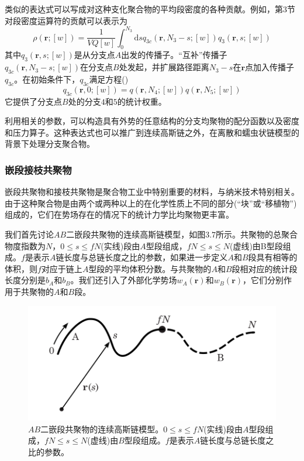 类似的表达式可以写成对这种支化聚合物的平均段密度的各种贡献。例如，第$3$节对段密度运算符的贡献可以表示为
\begin{equation}
\rho(\mathbf{r};[w])=\frac{1}{VQ[w]}\int _{0}^{N_3} \mathrm{d}sq_{3c}(\mathbf{r},N_3-s;[w])q_3(\mathbf{r},s;[w])
\end{equation}
其中$q_3(\mathbf{r},s;[w])$是从分支点$A$出发的传播子。“互补”传播子$q_{3c}(\mathbf{r},N_3-s;[w])$在分支点$B$处发起，并扩展路径距离$N_3-s$在$\mathbf{r}$点加入传播子$q_{3c}$。在初始条件下，$q_{3c}$满足方程(\label{传播子求导})
\begin{equation}
q_{3c}(\mathbf{r},0;[w])=q(\mathbf{r},N_4;[w])q(\mathbf{r},N_5;[w])
\end{equation}
它提供了分支点$B$处的分支$4$和$5$的统计权重。

利用相关的参数，可以构造具有外势的任意结构的分支均聚物的配分函数以及密度和压力算子。这种表达式也可以推广到连续高斯链之外，在离散和蠕虫状链模型的背景下处理分支聚合物。

\subsubsection{嵌段接枝共聚物}
嵌段共聚物和接枝共聚物是聚合物工业中特别重要的材料，与纳米技术特别相关。由于这种聚合物是由两个或两种以上的在化学性质上不同的部分(“块”或“移植物”)组成的，它们在势场存在的情况下的统计力学比均聚物更丰富。

我们首先讨论$AB$二嵌段共聚物的连续高斯链模型，如图$3.7$所示。共聚物的总聚合物度指数为$N$，$0\leq s \leq fN$(实线)段由$A$型段组成，$fN \leq s \leq N$(虚线)由B型段组成。$f$是表示$A$链长度与总链长度之比的参数，如果进一步定义$A$和$B$段具有相等的体积，则$f$对应于链上$A$型段的平均体积分数。与共聚物的$A$和$B$段相对应的统计段长度分别是$b_A$和$b_B$。我们还引入了外部化学势场$w_A(\mathbf{r})$和$w_B(\mathbf{r})$，它们分别作用于共聚物的$A$和$B$段。

\begin{figure}[H]
\centering
\includegraphics[scale=0.7]{./figures/37.png}
\caption{$AB$二嵌段共聚物的连续高斯链模型。$0\leq s \leq fN$(实线)段由$A$型段组成，$fN \leq s \leq N$(虚线)由$B$型段组成。$f$是表示$A$链长度与总链长度之比的参数。}
\end{figure}

